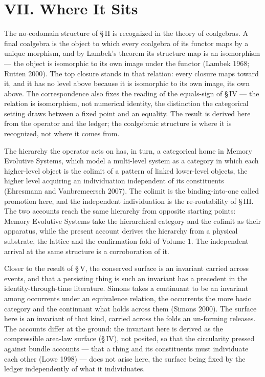\documentclass[11pt,oneside]{report}
\theoremstyle{definition}
\theoremstyle{remark}
\begin{document}
\section*{VII. Where It Sits}

The no-codomain structure of \S\,II is recognized in the theory of coalgebras. A final coalgebra
is the object to which every coalgebra of its functor maps by a unique morphism, and by Lambek's
theorem its structure map is an isomorphism --- the object is isomorphic to its own image under the
functor (Lambek 1968; Rutten 2000). The top closure stands in that relation: every closure maps
toward it, and it has no level above because it is isomorphic to its own image, its own above. The
correspondence also fixes the reading of the equals-sign of \S\,IV --- the relation is isomorphism,
not numerical identity, the distinction the categorical setting draws between a fixed point and an
equality. The result is derived here from the operator and the ledger; the coalgebraic structure is
where it is recognized, not where it comes from.

The hierarchy the operator acts on has, in turn, a categorical home in Memory Evolutive Systems,
which model a multi-level system as a category in which each higher-level object is the colimit of a
pattern of linked lower-level objects, the higher level acquiring an individuation independent of
its constituents (Ehresmann and Vanbremeersch 2007). The colimit is the binding-into-one called
promotion here, and the independent individuation is the re-routability of \S\,III. The two
accounts reach the same hierarchy from opposite starting points: Memory Evolutive Systems take the
hierarchical category and the colimit as their apparatus, while the present account derives the
hierarchy from a physical substrate, the lattice and the confirmation fold of Volume 1. The
independent arrival at the same structure is a corroboration of it.

Closer to the result of \S\,V, the conserved surface is an invariant carried across events, and
that a persisting thing is such an invariant has a precedent in the identity-through-time
literature. Simons takes a continuant to be an invariant among occurrents under an equivalence
relation, the occurrents the more basic category and the continuant what holds across them
(Simons 2000). The surface here is an invariant of that kind, carried across the folds an
un-forming releases. The accounts differ at the ground: the invariant here is derived as the
compressible area-law surface (\S\,IV), not posited, so that the circularity pressed against bundle
accounts --- that a thing and its constituents must individuate each other (Lowe 1998) --- does not
arise here, the surface being fixed by the ledger independently of what it individuates.
\end{document}
